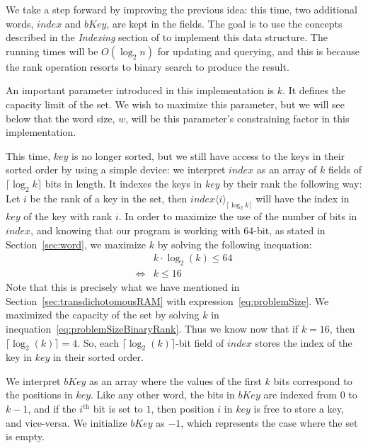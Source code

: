 We take a step forward by improving the previous idea: this time, two additional words, $index$ and $bKey$, are kept in the fields. The goal is to use the concepts described in the \textit{Indexing} section of \cite{patrascu2014dynamic} to implement this data structure. The running times will be $O(\log_2 n)$ for updating and querying, and this is because the rank operation resorts to binary search to produce the result.

An important parameter introduced in this implementation is $k$. It defines the capacity limit of the set. We wish to maximize this parameter, but we will see below that the word size, $w$, will be this parameter's constraining factor in this implementation.

This time, $key$ is no longer sorted, but we still have access to the keys in their sorted order by using a simple device: we interpret $index$ as an array of $k$ fields of $\lceil \log_2 k \rceil$ bits in length. It indexes the keys in $key$ by their rank the following way: Let $i$ be the rank of a key in the set, then $index\langle i\rangle_{\lceil \log_2 k \rceil}$ will have the index in $key$ of the key with rank $i$.
In order to maximize the use of the number of bits in $index$, and knowing that our program is working with 64-bit, as stated in Section~\ref{sec:word}, we maximize $k$ by solving the following inequation:
\begin{equation} \label{eq:problemSizeBinaryRank}
    \begin{aligned}
        &k \cdot \log_2(k) \leq 64 \\
        \iff &k \leq 16
    \end{aligned}
\end{equation}
Note that this is precisely what we have mentioned in Section~\ref{sec:transdichotomousRAM} with expression~\ref{eq:problemSize}.
We maximized the capacity of the set by solving $k$ in inequation~\ref{eq:problemSizeBinaryRank}.
Thus we know now that if $k = 16$, then $\lceil \log_2(k) \rceil = 4$.
So, each $\lceil \log_2(k) \rceil$-bit field of $index$ stores the index of the key in $key$ in their sorted order.

We interpret $bKey$ as an array where the values of the first $k$ bits correspond to the positions in $key$. Like any other word, the bits in $bKey$ are indexed from $0$ to $k-1$, and if the $i^{\text{th}}$ bit is set to $1$, then position $i$ in $key$ is free to store a key, and vice-versa. We initialize $bKey$ as $-1$, which represents the case where the set is empty.

